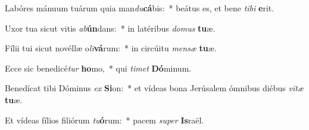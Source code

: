 \item Labóres mánuum tuárum quia man\textit{du}\textbf{cá}bis:~* beátus es, et bene \textit{ti}\textit{bi} \textbf{e}rit.
\item Uxor tua sicut vitis \textit{ab}\textbf{ún}dans:~* in latéribus \textit{do}\textit{mus} \textbf{tu}æ.
\item Fílii tui sicut novéllæ o\textit{li}\textbf{vá}rum:~* in circúitu \textit{men}\textit{sæ} \textbf{tu}æ.
\item Ecce sic benedicé\textit{tur} \textbf{ho}mo,~* qui \textit{ti}\textit{met} \textbf{Dó}minum.
\item Benedícat tibi Dóminus \textit{ex} \textbf{Si}on:~* et vídeas bona Jerúsalem ómnibus diébus \textit{vi}\textit{tæ} \textbf{tu}æ.
\item Et vídeas fílios filiórum \textit{tu}\textbf{ó}rum:~* pacem \textit{su}\textit{per} \textbf{Is}raël.
